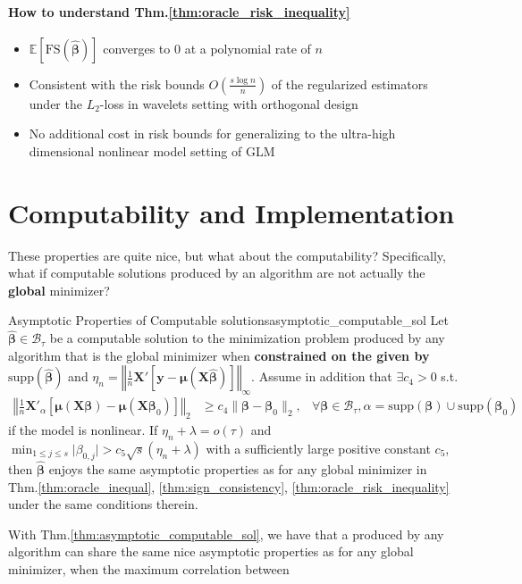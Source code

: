 \documentclass[twoside]{article}
\begin{document}
\paragraph*{How to understand Thm.\ref{thm:oracle_risk_inequality}}
\begin{itemize}
    \item $\mathbb{E}\left[\mathrm{FS}\left(\hat{\boldsymbol{\beta}}\right)\right]$ converges to 0 at a polynomial rate of $n$
    \item Consistent with the risk bounds $O\left(\frac{s\log n}{n}\right)$ of the regularized estimators under the $L_2$-loss in wavelets setting with orthogonal design 
    \item No additional cost in risk bounds for generalizing to the ultra-high dimensional nonlinear model setting of GLM
\end{itemize}

\section{Computability and Implementation}
These properties are quite nice, but what about the computability? Specifically, what if computable solutions produced by an algorithm are not actually the \textbf{global} minimizer?
\begin{theorem}{Asymptotic Properties of Computable solutions}{asymptotic_computable_sol}
    Let $\hat{\boldsymbol{\beta}} \in \mathcal{B}_{\tau}$ be a computable solution to the minimization problem produced by any algorithm that is the global minimizer when \textbf{constrained on the  given by} $\mathrm{supp}\left( \hat{\boldsymbol{\beta}} \right)$ and $\eta_n =\left\Vert \frac{1}{n}\mathbf{X}'\left[\mathbf{y}-\boldsymbol{\mu}\left( \mathbf{X}\hat{\boldsymbol{\beta}} \right)\right] \right\Vert _{\infty}$.
    Assume in addition that $\exists c_4 >0$ s.t. 
    \begin{align*}
        \left\Vert \frac{1}{n}\mathbf{X}'_{\alpha}\left[ \boldsymbol{\mu}\left( \mathbf{X}\boldsymbol{\beta} \right)-\boldsymbol{\mu}\left( \mathbf{X}\boldsymbol{\beta}_0 \right)\right] \right\Vert _2 & \geq c_4 \lVert \boldsymbol{\beta}-\boldsymbol{\beta}_0\rVert _2, & \forall \boldsymbol{\beta}\in\mathcal{B}_{\tau},\alpha = \mathrm{supp}\left( \boldsymbol{\beta} \right) \cup  \mathrm{supp}\left( \boldsymbol{\beta}_0 \right)
    \end{align*}
    if the model is nonlinear. If $\eta_n + \lambda = o(\tau)$ and $\min_{1\leq j\leq s}\lvert \beta_{0,j}\rvert > c_5 \sqrt{s}(\eta_n+\lambda)$ with a sufficiently large positive constant $c_5$, then $\hat{\boldsymbol{\beta}}$ enjoys the same asymptotic properties as for any global minimizer in Thm.\ref{thm:oracle_inequal}, \ref{thm:sign_consistency}, \ref{thm:oracle_risk_inequality} under the same conditions therein.
\end{theorem}
With Thm.\ref{thm:asymptotic_computable_sol}, we have that a  produced by any algorithm can share the same nice asymptotic properties as for any global minimizer, when the maximum correlation between

\newpage


\end{document}
